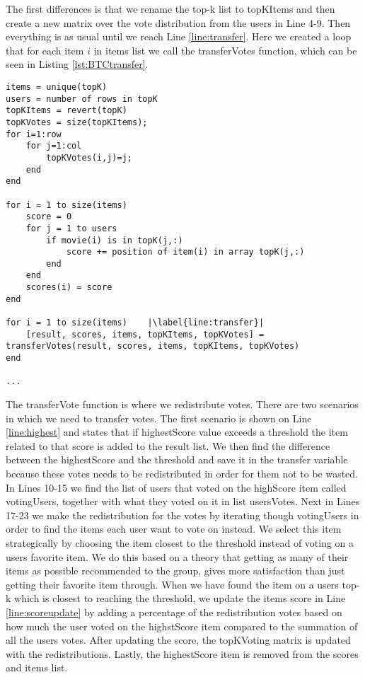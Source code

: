 The first differences is that we rename the top-k list to topKItems and then create a new matrix over the vote distribution from the users in Line 4-9. Then everything is as usual until we reach Line \ref{line:transfer}. Here we created a loop that for each item $i$ in items list we call the transferVotes function, which can be seen in Listing \ref{lst:BTCtransfer}.


\begin{lstlisting}[caption={Borda Transferable Count implementation},label=lst:BTC,escapechar=|]
items = unique(topK)
users = number of rows in topK
topKItems = revert(topK)
topKVotes = size(topKItems);
for i=1:row
    for j=1:col
        topKVotes(i,j)=j;
    end 
end

for i = 1 to size(items)
	score = 0
	for j = 1 to users
		if movie(i) is in topK(j,:)
			score += position of item(i) in array topK(j,:)
		end
	end
	scores(i) = score
end

for i = 1 to size(items)	|\label{line:transfer}|
	[result, scores, items, topKItems, topKVotes] = transferVotes(result, scores, items, topKItems, topKVotes)
end
	
...
\end{lstlisting}

The transferVote function is where we redistribute votes. There are two scenarios in which we need to transfer votes. The first scenario is shown on Line \ref{line:highest} and states that if highestScore value exceeds a threshold the item related to that score is added to the result list. We then find the difference between the highestScore and the threshold and save it in the transfer variable because these votes needs to be redistributed in order for them not to be wasted. In Lines 10-15 we find the list of users that voted on the highScore item  called votingUsers, together with what they voted on it in list usersVotes. Next in Lines 17-23 we make the redistribution for the votes by iterating though votingUsers in order to find the items each user want to vote on instead. We select this item strategically by choosing the item closest to the threshold instead of voting on a users favorite item. We do this based on a theory that getting as many of their items as possible recommended to the group, gives more satisfaction than just getting their favorite item through. When we have found the item on a users top-k which is closest to reaching the threshold, we update the items score in Line \ref{line:scoreupdate} by adding a percentage of the redistribution votes based on how much the user voted on the highstScore item compared to the summation of all the users votes. After updating the score, the topKVoting matrix is updated with the redistributions. Lastly, the highestScore item is removed from the scores and items list. 

